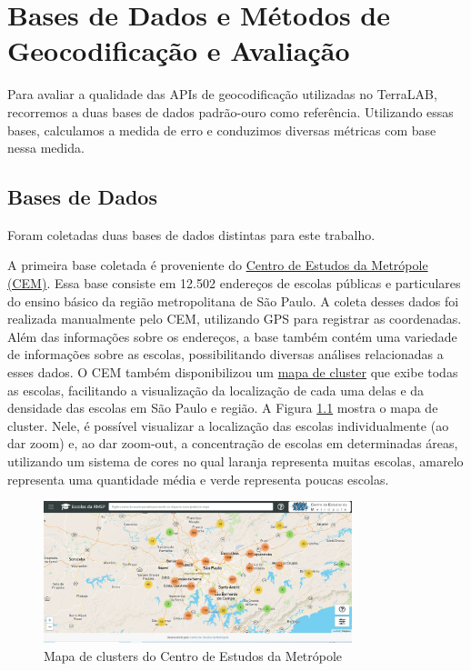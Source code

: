 \chapter{Bases de Dados e Métodos de Geocodificação e Avaliação} \label{desenvolvimento}

Para avaliar a qualidade das APIs de geocodificação utilizadas no TerraLAB, recorremos a duas bases de dados padrão-ouro como referência. Utilizando essas bases, calculamos a medida de erro e conduzimos diversas métricas com base nessa medida.

\section{Bases de Dados}
Foram coletadas duas bases de dados distintas para este trabalho.

A primeira base coletada é proveniente do \href{https://centrodametropole.fflch.usp.br/pt-br}{Centro de Estudos da Metrópole (CEM)}. Essa base consiste em 12.502 endereços de escolas públicas e particulares do ensino básico da região metropolitana de São Paulo. A coleta desses dados foi realizada manualmente pelo CEM, utilizando GPS para registrar as coordenadas. Além das informações sobre os endereços, a base também contém uma variedade de informações sobre as escolas, possibilitando diversas análises relacionadas a esses dados. O CEM também disponibilizou um \href{http://200.144.244.241:3002/geolocation}{mapa de cluster} que exibe todas as escolas, facilitando a visualização da localização de cada uma delas e da densidade das escolas em São Paulo e região. A Figura \ref{fig:siteCEM} mostra o mapa de cluster. Nele, é possível visualizar a localização das escolas individualmente (ao dar zoom) e, ao dar zoom-out, a concentração de escolas em determinadas áreas, utilizando um sistema de cores no qual laranja representa muitas escolas, amarelo representa uma quantidade média e verde representa poucas escolas. 

\begin{figure} 
    \centering
    \includegraphics[width=0.8\textwidth]{Figuras/siteCEM.jpeg}
    \caption{Mapa de clusters do Centro de Estudos da Metrópole}
    \label{fig:siteCEM}
\end{figure}

